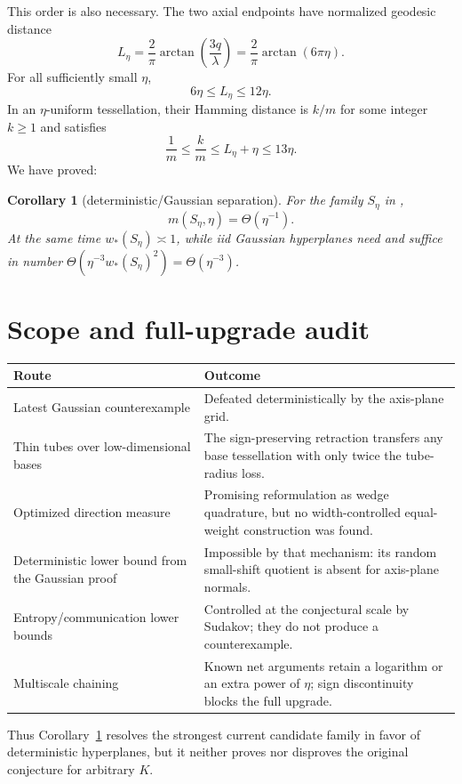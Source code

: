 \documentclass[11pt]{article}
\newtheorem{corollary}[theorem]{Corollary}
\begin{document}
This order is also necessary.  The two axial endpoints have normalized
geodesic distance
\[
 L_\eta=\frac{2}{\pi}\arctan\!\left(\frac{3q}{\lambda}\right)
 =\frac{2}{\pi}\arctan(6\pi\eta).
\]
For all sufficiently small \(\eta\),
\[
 6\eta\le L_\eta\le12\eta.
\]
In an \(\eta\)-uniform tessellation, their Hamming distance is \(k/m\) for
some integer \(k\ge1\) and satisfies
\[
 \frac1m\le\frac{k}{m}\le L_\eta+\eta\le13\eta.
\]
We have proved:

\begin{corollary}[deterministic/Gaussian separation]\label{cor:separation}
For the family \(S_\eta\) in \cite{ds},
\[
 m(S_\eta,\eta)=\Theta(\eta^{-1}).
\]
At the same time \(w_*(S_\eta)\asymp1\), while iid Gaussian hyperplanes need
and suffice in number
\(\Theta(\eta^{-3}w_*(S_\eta)^2)=\Theta(\eta^{-3})\).
\end{corollary}

\section*{Scope and full-upgrade audit}
\begin{center}
\small
\begin{tabularx}{\textwidth}{@{}p{}X@{}}
\toprule
Route & Outcome\\
\midrule
Latest Gaussian counterexample & Defeated deterministically by
the axis-plane grid.\\
Thin tubes over low-dimensional bases & The sign-preserving retraction
transfers any base tessellation with only twice the tube-radius loss.\\
Optimized direction measure & Promising reformulation as wedge quadrature,
but no width-controlled equal-weight construction was found.\\
Deterministic lower bound from the Gaussian proof & Impossible by that
mechanism: its random small-shift quotient is absent for axis-plane normals.\\
Entropy/communication lower bounds & Controlled at the conjectural scale by
Sudakov; they do not produce a counterexample.\\
Multiscale chaining & Known net arguments retain a logarithm or an extra
power of \(\eta\); sign discontinuity blocks the full upgrade.\\
\bottomrule
\end{tabularx}
\end{center}

Thus Corollary~\ref{cor:separation} resolves the strongest current candidate
family in favor of deterministic hyperplanes, but it neither proves nor
disproves the original conjecture for arbitrary \(K\).
\end{document}

